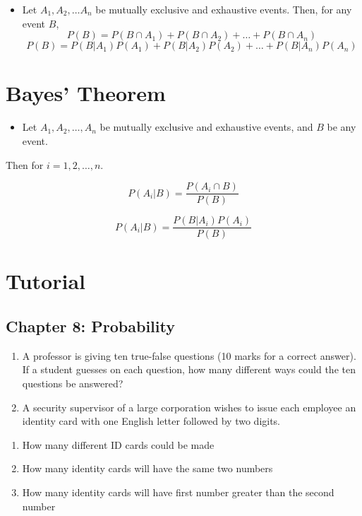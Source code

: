 \documentclass[]{book}
\providecommand{\tightlist}{%
  \setlength{\itemsep}{0pt}\setlength{\parskip}{0pt}}
\begin{document}
\begin{itemize}
\tightlist
\item
  Let \(A_1, A_2, \dots A_n\) be mutually exclusive and exhaustive events. Then, for any event \(B\),
  \[P(B) = P(B \cap A_1) + P(B \cap A_2) + \dots + P(B \cap A_n)\]
  \[P(B) = P(B|A_1) P(A_1) + P(B|A_2) P(A_2) +\dots+ P(B|A_n) P(A_n)\]
\end{itemize}

\hypertarget{bayes-theorem}{%
\section{Bayes' Theorem}\label{bayes-theorem}}

\begin{itemize}
\tightlist
\item
  Let \(A_1, A_2, \dots,A_n\) be mutually exclusive and exhaustive events, and \(B\) be any event.
\end{itemize}

Then for \(i = 1, 2, \dots, n\).

\[P(A_i|B) = \frac{P(A_i \cap B)}{P(B)}\]

\[P(A_i|B) = \frac{P(B|A_i)P(A_i)}{P(B)}\]

\newpage

\hypertarget{tutorial-3}{%
\section{Tutorial}\label{tutorial-3}}

\hypertarget{chapter-8-probability}{%
\subsection*{Chapter 8: Probability}\label{chapter-8-probability}}

\begin{enumerate}
\def\labelenumi{\arabic{enumi}.}
\item
  A professor is giving ten true-false questions (10 marks for a correct answer). If a student guesses on each question, how many different ways could the ten questions be answered?
\item
  A security supervisor of a large corporation wishes to issue each employee an identity card with one English letter followed by two digits.
\end{enumerate}

\begin{enumerate}
\def\labelenumi{(\alph{enumi})}
\tightlist
\item
  How many different ID cards could be made
\item
  How many identity cards will have the same two numbers
\item
  How many identity cards will have first number greater than the second number
\end{enumerate}
\end{document}
